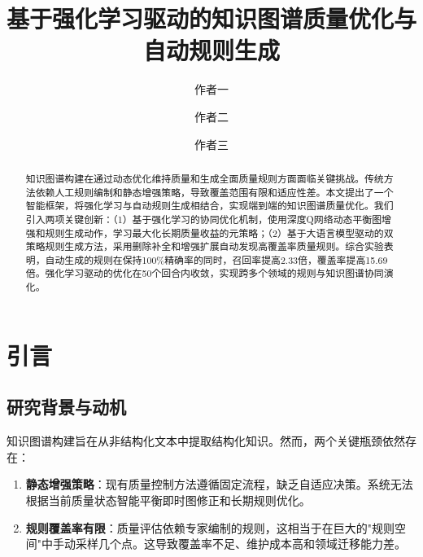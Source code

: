 \documentclass[runningheads]{llncs}
\begin{document}
\title{基于强化学习驱动的知识图谱质量优化与自动规则生成}


\author{作者一 \and
作者二 \and
作者三}



\maketitle

\begin{abstract}
知识图谱构建在通过动态优化维持质量和生成全面质量规则方面面临关键挑战。传统方法依赖人工规则编制和静态增强策略，导致覆盖范围有限和适应性差。本文提出了一个智能框架，将强化学习与自动规则生成相结合，实现端到端的知识图谱质量优化。我们引入两项关键创新：（1）基于强化学习的协同优化机制，使用深度Q网络动态平衡图增强和规则生成动作，学习最大化长期质量收益的元策略；（2）基于大语言模型驱动的双策略规则生成方法，采用删除补全和增强扩展自动发现高覆盖率质量规则。综合实验表明，自动生成的规则在保持100\%精确率的同时，召回率提高2.33倍，覆盖率提高15.69倍。强化学习驱动的优化在50个回合内收敛，实现跨多个领域的规则与知识图谱协同演化。

\end{abstract}

\section{引言}

\subsection{研究背景与动机}
知识图谱构建旨在从非结构化文本中提取结构化知识。然而，两个关键瓶颈依然存在：

\begin{enumerate}
    \item \textbf{静态增强策略}：现有质量控制方法遵循固定流程，缺乏自适应决策。系统无法根据当前质量状态智能平衡即时图修正和长期规则优化。
    \item \textbf{规则覆盖率有限}：质量评估依赖专家编制的规则，这相当于在巨大的"规则空间"中手动采样几个点。这导致覆盖率不足、维护成本高和领域迁移能力差。
\end{enumerate}
\end{document}
